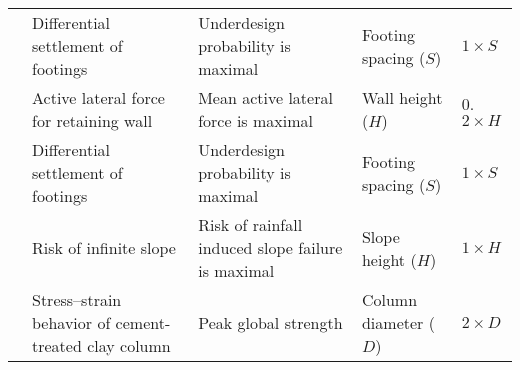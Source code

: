 \begin{table}[htb]
\begin{tabular}{p{} p{} p{} b{} p{}}
        \citet{Ahmed20142}  & Differential settlement of footings & Underdesign probability is maximal & Footing spacing ($S$) & $1\times S$ \\
        \citet{Hu2015121} & Active lateral force for retaining wall & Mean active lateral force is maximal & Wall height ($H$) & 0.$2\times H$ \\
        \citet{Stuedlein201731} & Differential settlement of footings & Underdesign probability is maximal & Footing spacing ($S$) & $1\times S$ \\
        \citet{Ali2014102} & Risk of infinite slope & Risk of rainfall induced slope failure is maximal & Slope height ($H$) & $1\times H$ \\
        \citet{Pan2018150} & Stress–strain behavior of cement-treated clay column & Peak global strength & Column diameter ($D$) & $2\times D$ \\
        \bottomrule
    \end{tabular}
\end{table}